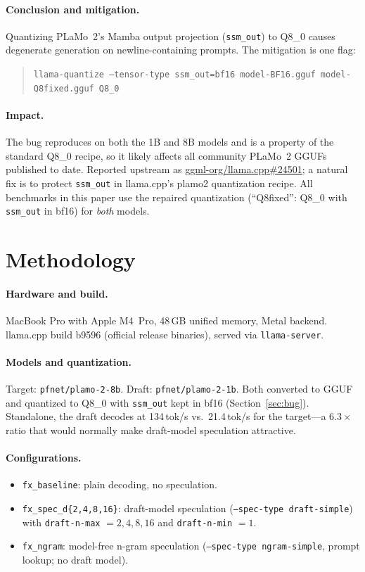 \documentclass[10pt]{article}
\newcommand{\code}[1]{\texttt{#1}}
\begin{document}
\paragraph{Conclusion and mitigation.} Quantizing PLaMo~2's Mamba output
projection (\code{ssm\_out}) to Q8\_0 causes degenerate generation on
newline-containing prompts. The mitigation is one flag:

\begin{quote}
\code{llama-quantize --tensor-type ssm\_out=bf16 model-BF16.gguf
model-Q8fixed.gguf Q8\_0}
\end{quote}

\paragraph{Impact.} The bug reproduces on both the 1B and 8B models and is a
property of the standard Q8\_0 recipe, so it likely affects all community
PLaMo~2 GGUFs published to date. Reported upstream as
\href{https://github.com/ggml-org/llama.cpp/issues/24501}{ggml-org/llama.cpp\#24501};
a natural fix is to protect \code{ssm\_out} in llama.cpp's plamo2 quantization recipe. All benchmarks in
this paper use the repaired quantization (``Q8fixed'': Q8\_0 with
\code{ssm\_out} in bf16) for \emph{both} models.

\section{Methodology}

\paragraph{Hardware and build.} MacBook Pro with Apple M4~Pro, 48\,GB
unified memory, Metal backend. llama.cpp build b9596 (official release
binaries), served via \code{llama-server}.

\paragraph{Models and quantization.} Target: \code{pfnet/plamo-2-8b}.
Draft: \code{pfnet/plamo-2-1b}. Both converted to GGUF and quantized to
Q8\_0 with \code{ssm\_out} kept in bf16 (Section~\ref{sec:bug}). Standalone,
the draft decodes at 134\,tok/s vs.\ 21.4\,tok/s for the target---a
$6.3\times$ ratio that would normally make draft-model speculation
attractive.

\paragraph{Configurations.}
\begin{itemize}
  \item \code{fx\_baseline}: plain decoding, no speculation.
  \item \code{fx\_spec\_d\{2,4,8,16\}}: draft-model speculation
    (\code{--spec-type draft-simple}) with \code{draft-n-max} $= 2, 4, 8,
    16$ and \code{draft-n-min} $= 1$.
  \item \code{fx\_ngram}: model-free n-gram speculation
    (\code{--spec-type ngram-simple}, prompt lookup; no draft model).
\end{itemize}
\end{document}
